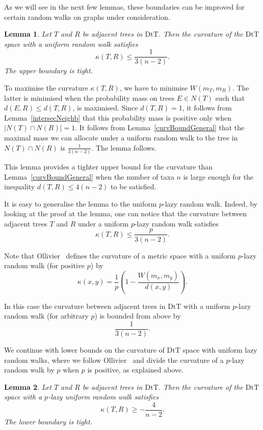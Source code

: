 \documentclass{amsart}
\newtheorem{lemma}{Lemma}
\newcommand{\dts}{\mathrm{DtT}}
\begin{document}
As we will see in the next few lemmas, these boundaries can be improved for 
certain random walks on graphs under consideration. 

\begin{lemma}\label{uniformUpper}
Let $T$ and $R$ be adjacent trees in $\dts$. Then the curvature of the $\dts$
space with a uniform random walk satisfies 
\[
\kappa(T,R) \leq \dfrac{1}{3(n-2)}.
\]
The upper boundary is tight. 
\end{lemma}

\proof
To maximise the curvature $\kappa(T,R)$, we have to minimise $W(m_T,m_R)$. 
The latter is minimised when the probability mass on trees $E \in N(T)$ 
such that
$d(E,R) \leq d(T,R)$, is maximised. Since $d(T,R) = 1$, it follows from 
Lemma~\ref{intersecNeighb} that this probability mass is positive only
when $|N(T) \cap N(R)| = 1$. It follows from Lemma~\ref{curvBoundGeneral} that
the maximal mass we can allocate under a uniform random walk to the tree in 
$N(T) \cap N(R)$ is $\frac{1}{3(n-2)}$. The lemma follows. 
\endproof

This lemma provides a tighter upper bound for the curvature than 
Lemma~\ref{curvBoundGeneral} when the number of taxa $n$ is large enough for
the inequality $d(T,R) \leq 4(n-2)$ to be satisfied. 

It is easy to generalise the lemma to the uniform $p$-lazy random walk. 
Indeed, by looking at the proof at the lemma, one can notice that the curvature
between adjacent trees $T$ and $R$ under a uniform $p$-lazy random walk 
satisfies 
\[
\kappa(T,R) \leq \frac{p}{3(n-2)}.
\]

Note that Ollivier~\cite{Ollivier2009-cj} defines the curvature of a metric 
space with a uniform $p$-lazy random walk (for positive $p$) by 
\[
\kappa(x,y) = \frac1p (1 - \frac{W(m_x, m_y)}{d(x, y)}). 
\]

In this case the curvature between adjacent trees in $\dts$ with a uniform 
$p$-lazy random walk (for arbitrary $p$) is bounded from above by
\[
\frac{1}{3(n-2)}.
\]

We continue with lower bounds on the curvature of $\dts$ space with uniform lazy
random walks, where we follow 
Ollivier~\cite{Ollivier2009-cj} and divide the curvature of a $p$-lazy random 
walk by $p$ when $p$ is positive, as explained above. 

\begin{lemma}\label{uniformLower}
Let $T$ and $R$ be adjacent trees in $\dts$. Then the curvature of the $\dts$
space with a $p$-lazy uniform random walk satisfies
\[
\kappa(T,R) \geq -\frac{4}{n-2}.
\]
The lower boundary is tight. 
\end{lemma}
\end{document}
